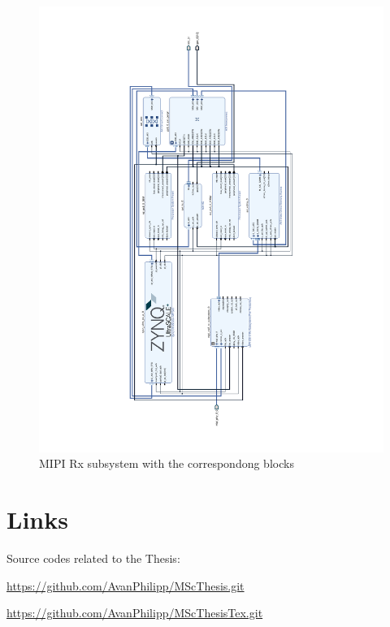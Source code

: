 \begin{figure}
    \centering
    \includegraphics[width=\linewidth]{assets/MIPI_1.pdf}
    \caption{MIPI Rx subsystem with the correspondong blocks}
    \label{fig:block_mipi}
\end{figure}

\chapter{Links}
Source codes related to the Thesis:

\url{https://github.com/AvanPhilipp/MScThesis.git}

\url{https://github.com/AvanPhilipp/MScThesisTex.git}